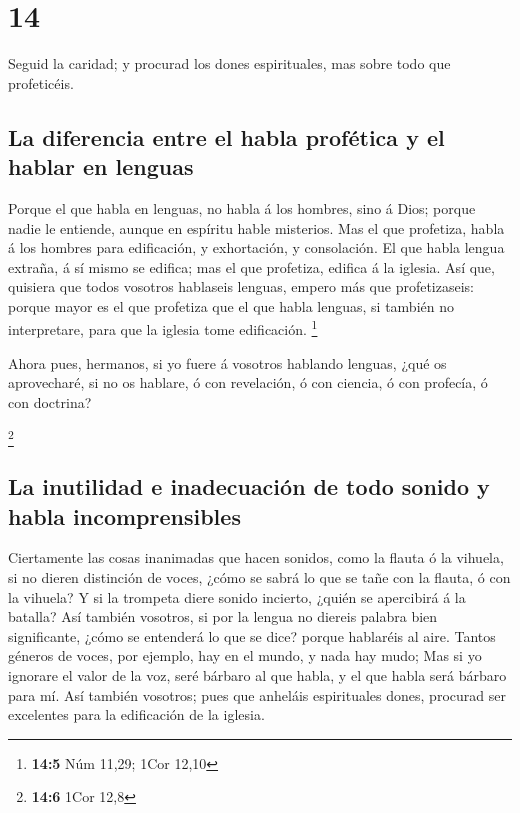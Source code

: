 \hypertarget{section-13}{%
\section{14}\label{section-13}}

 Seguid la caridad; y procurad los dones espirituales, mas
sobre todo que profeticéis.

\hypertarget{la-diferencia-entre-el-habla-profuxe9tica-y-el-hablar-en-lenguas}{%
\subsection{La diferencia entre el habla profética y el hablar en
lenguas}\label{la-diferencia-entre-el-habla-profuxe9tica-y-el-hablar-en-lenguas}}

 Porque el que habla en lenguas, no habla á los hombres,
sino á Dios; porque nadie le entiende, aunque en espíritu hable
misterios.  Mas el que profetiza, habla á los hombres para
edificación, y exhortación, y consolación.  El que habla
lengua extraña, á sí mismo se edifica; mas el que profetiza, edifica á
la iglesia.  Así que, quisiera que todos vosotros
hablaseis lenguas, empero más que profetizaseis: porque mayor es el que
profetiza que el que habla lenguas, si también no interpretare, para que
la iglesia tome edificación. \footnote{\textbf{14:5} Núm 11,29; 1Cor
  12,10}

 Ahora pues, hermanos, si yo fuere á vosotros hablando
lenguas, ¿qué os aprovecharé, si no os hablare, ó con revelación, ó con
ciencia, ó con profecía, ó con doctrina?

\footnote{\textbf{14:6} 1Cor 12,8}

\hypertarget{la-inutilidad-e-inadecuaciuxf3n-de-todo-sonido-y-habla-incomprensibles}{%
\subsection{La inutilidad e inadecuación de todo sonido y habla
incomprensibles}\label{la-inutilidad-e-inadecuaciuxf3n-de-todo-sonido-y-habla-incomprensibles}}

 Ciertamente las cosas inanimadas que hacen sonidos, como
la flauta ó la vihuela, si no dieren distinción de voces, ¿cómo se sabrá
lo que se tañe con la flauta, ó con la vihuela?  Y si la
trompeta diere sonido incierto, ¿quién se apercibirá á la batalla?
 Así también vosotros, si por la lengua no diereis palabra
bien significante, ¿cómo se entenderá lo que se dice? porque hablaréis
al aire.  Tantos géneros de voces, por ejemplo, hay en el
mundo, y nada hay mudo;  Mas si yo ignorare el valor de
la voz, seré bárbaro al que habla, y el que habla será bárbaro para mí.
 Así también vosotros; pues que anheláis espirituales
dones, procurad ser excelentes para la edificación de la iglesia.

